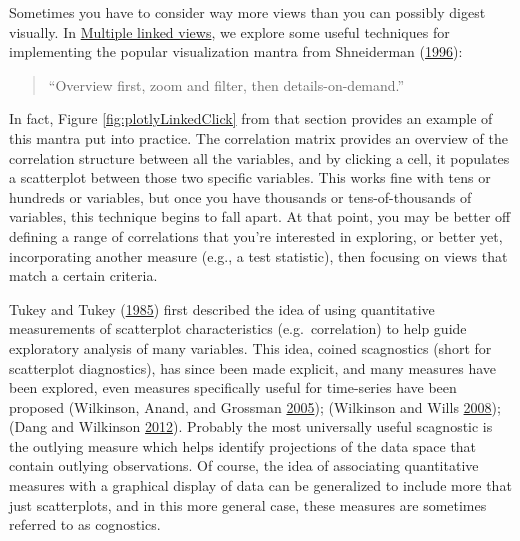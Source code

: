 \documentclass[12pt,]{isuthesis}
\begin{document}
Sometimes you have to consider way more views than you can possibly
digest visually. In \protect\hyperlink{multiple-linked-views}{Multiple
linked views}, we explore some useful techniques for implementing the
popular visualization mantra from Shneiderman
(\protect\hyperlink{ref-details-on-demand}{1996}):

\begin{quote}
``Overview first, zoom and filter, then details-on-demand.''
\end{quote}

In fact, Figure \ref{fig:plotlyLinkedClick} from that section provides
an example of this mantra put into practice. The correlation matrix
provides an overview of the correlation structure between all the
variables, and by clicking a cell, it populates a scatterplot between
those two specific variables. This works fine with tens or hundreds or
variables, but once you have thousands or tens-of-thousands of
variables, this technique begins to fall apart. At that point, you may
be better off defining a range of correlations that you're interested in
exploring, or better yet, incorporating another measure (e.g., a test
statistic), then focusing on views that match a certain criteria.

Tukey and Tukey (\protect\hyperlink{ref-scagnostics-tukey}{1985}) first
described the idea of using quantitative measurements of scatterplot
characteristics (e.g.~correlation) to help guide exploratory analysis of
many variables. This idea, coined scagnostics (short for scatterplot
diagnostics), has since been made explicit, and many measures have been
explored, even measures specifically useful for time-series have been
proposed (Wilkinson, Anand, and Grossman
\protect\hyperlink{ref-Wilkinson:2005b}{2005}); (Wilkinson and Wills
\protect\hyperlink{ref-Wilkinson:2008}{2008}); (Dang and Wilkinson
\protect\hyperlink{ref-Wilkinson:2012}{2012}). Probably the most
universally useful scagnostic is the outlying measure which helps
identify projections of the data space that contain outlying
observations. Of course, the idea of associating quantitative measures
with a graphical display of data can be generalized to include more that
just scatterplots, and in this more general case, these measures are
sometimes referred to as cognostics.
\end{document}
